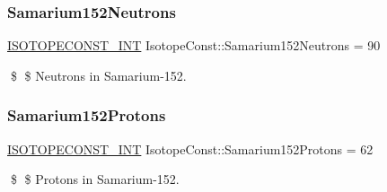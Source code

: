 \subsubsection{\texorpdfstring{Samarium152\+Neutrons}{Samarium152Neutrons}}
{\footnotesize\ttfamily \mbox{\hyperlink{group___isotope_const-_macros_ga5f18360b3e99483a35c32d789e62621c}{I\+S\+O\+T\+O\+P\+E\+C\+O\+N\+S\+T\+\_\+\+I\+NT}} Isotope\+Const\+::\+Samarium152\+Neutrons = 90}

\$ \$ Neutrons in Samarium-\/152. \mbox{\label{group___isotope_const-_samarium-_sm152_ga3c1422d06d2fddbdfbcd91eb47f2ad2c}} 
\subsubsection{\texorpdfstring{Samarium152\+Protons}{Samarium152Protons}}
{\footnotesize\ttfamily \mbox{\hyperlink{group___isotope_const-_macros_ga5f18360b3e99483a35c32d789e62621c}{I\+S\+O\+T\+O\+P\+E\+C\+O\+N\+S\+T\+\_\+\+I\+NT}} Isotope\+Const\+::\+Samarium152\+Protons = 62}

\$ \$ Protons in Samarium-\/152. 